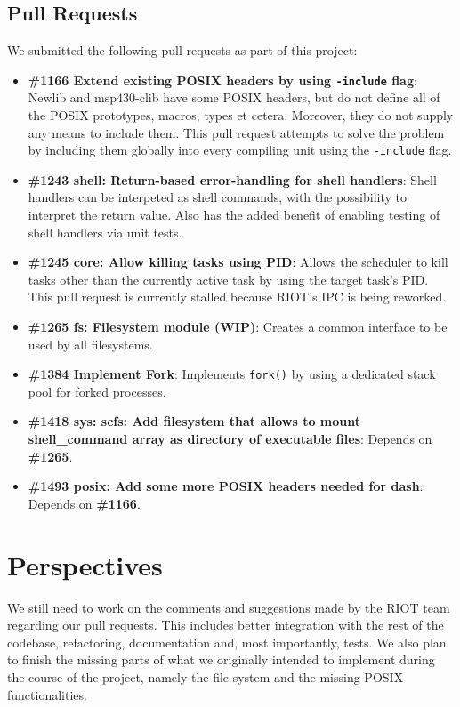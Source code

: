 \documentclass[conference]{IEEEtran}
\begin{document}
\subsection{Pull Requests}
\label{sub:Pull Requests}
We submitted the following pull requests as part of this project:

\begin{itemize}
  \item \textbf{\#1166 Extend existing POSIX headers by using
    \texttt{-include} flag}\cite{1166}: Newlib and msp430-clib have some
    POSIX headers, but do not define all of the POSIX prototypes,
    macros, types et cetera.  Moreover, they do not supply any means to
    include them. This pull request attempts to solve the problem by
    including them globally into every compiling unit using the
    \texttt{-include} flag.
  \item \textbf{\#1243 shell: Return-based error-handling for shell
    handlers}\cite{1243}: Shell handlers can be interpeted as shell
    commands, with the possibility to interpret the return value. Also
    has the added benefit of enabling testing of shell handlers via unit
    tests.
  \item \textbf{\#1245 core: Allow killing tasks using PID}\cite{1245}:
    Allows the scheduler to kill tasks other than the currently active
    task by using the target task's PID. This pull request is currently
    stalled because RIOT's IPC is being reworked.
  \item \textbf{\#1265 fs: Filesystem module (WIP)}\cite{1265}: Creates
    a common interface to be used by all filesystems.
  \item \textbf{\#1384 Implement Fork}\cite{1384}: Implements
    \texttt{fork()} by using a dedicated stack pool for forked
    processes.
  \item \textbf{\#1418 sys: scfs: Add filesystem that allows to mount
    shell\_command array as directory of executable files}\cite{1418}:
    Depends on \textbf{\#1265}.
  \item \textbf{\#1493 posix: Add some more POSIX headers needed for
    dash}\cite{1493}: Depends on \textbf{\#1166}.
\end{itemize}

\section{Perspectives}
\label{sec:Perspectives}
We still need to work on the comments and suggestions made by the RIOT
team regarding our pull requests. This includes better integration with
the rest of the codebase, refactoring, documentation and, most
importantly, tests. We also plan to finish the missing parts of what we
originally intended to implement during the course of the project,
namely the file system and the missing POSIX functionalities.
\end{document}
